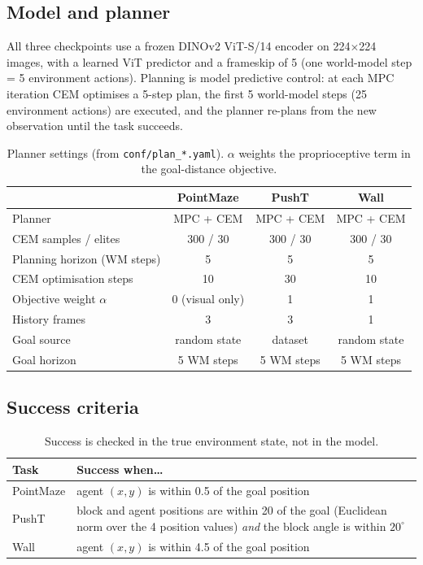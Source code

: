 \documentclass[11pt]{article}
\begin{document}
\subsection{Model and planner}

All three checkpoints use a frozen DINOv2 ViT-S/14 encoder on
224$\times$224 images, with a learned ViT predictor and a frameskip of 5
(one world-model step = 5 environment actions). Planning is model predictive
control: at each MPC iteration CEM optimises a 5-step plan, the first 5
world-model steps (25 environment actions) are executed, and the planner
re-plans from the new observation until the task succeeds.

\begin{table}[H]
  \centering
  \caption{Planner settings (from \texttt{conf/plan\_*.yaml}). $\alpha$ weights
  the proprioceptive term in the goal-distance objective.}
  \label{tab:planner}
  \begin{tabular}{lccc}
    \toprule
    & \textbf{PointMaze} & \textbf{PushT} & \textbf{Wall} \\
    \midrule
    Planner                    & MPC + CEM & MPC + CEM & MPC + CEM \\
    CEM samples / elites       & 300 / 30  & 300 / 30  & 300 / 30 \\
    Planning horizon (WM steps)& 5         & 5         & 5 \\
    CEM optimisation steps     & 10        & 30        & 10 \\
    Objective weight $\alpha$  & 0 (visual only) & 1   & 1 \\
    History frames             & 3         & 3         & 1 \\
    Goal source                & random state & dataset & random state \\
    Goal horizon               & 5 WM steps & 5 WM steps & 5 WM steps \\
    \bottomrule
  \end{tabular}
\end{table}

\subsection{Success criteria}

\begin{table}[H]
  \centering
  \caption{Success is checked in the true environment state, not in the model.}
  \begin{tabularx}{\linewidth}{lX}
    \toprule
    \textbf{Task} & \textbf{Success when\ldots} \\
    \midrule
    PointMaze & agent $(x,y)$ is within 0.5 of the goal position \\
    PushT     & block and agent positions are within 20 of the goal
                (Euclidean norm over the 4 position values) \emph{and} the block
                angle is within $20^\circ$ \\
    Wall      & agent $(x,y)$ is within 4.5 of the goal position \\
    \bottomrule
  \end{tabularx}
\end{table}
\end{document}
